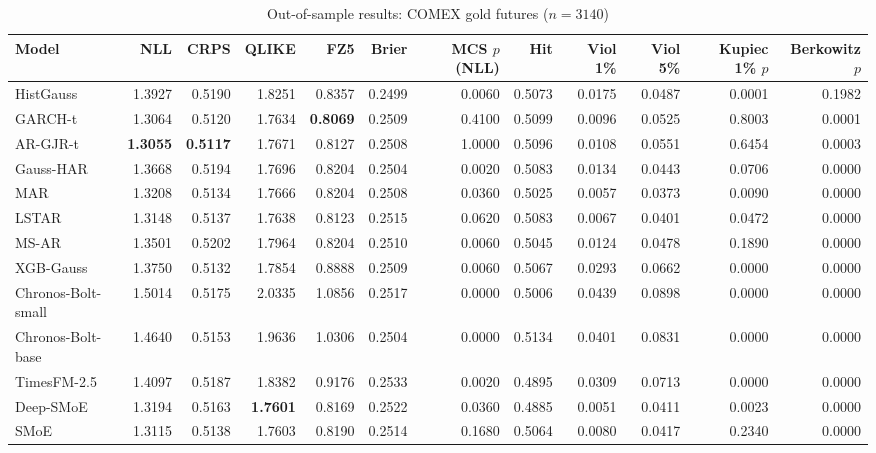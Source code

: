 \begin{table}[!htbp]\centering\scriptsize
\caption{Out-of-sample results: COMEX gold futures ($n=3140$)}\label{tab:asset_gc_fut}
\begin{adjustbox}{max width=\textwidth}
\begin{tabular}{lrrrrrrrrrrr}
\toprule
Model & NLL & CRPS & QLIKE & FZ5 & Brier & MCS $p$ (NLL) & Hit & Viol 1\% & Viol 5\% & Kupiec 1\% $p$ & Berkowitz $p$\\
\midrule
HistGauss & 1.3927 & 0.5190 & 1.8251 & 0.8357 & 0.2499 & 0.0060 & 0.5073 & 0.0175 & 0.0487 & 0.0001 & 0.1982\\
GARCH-t & 1.3064 & 0.5120 & 1.7634 & \textbf{0.8069} & 0.2509 & 0.4100 & 0.5099 & 0.0096 & 0.0525 & 0.8003 & 0.0001\\
AR-GJR-t & \textbf{1.3055} & \textbf{0.5117} & 1.7671 & 0.8127 & 0.2508 & 1.0000 & 0.5096 & 0.0108 & 0.0551 & 0.6454 & 0.0003\\
Gauss-HAR & 1.3668 & 0.5194 & 1.7696 & 0.8204 & 0.2504 & 0.0020 & 0.5083 & 0.0134 & 0.0443 & 0.0706 & 0.0000\\
MAR & 1.3208 & 0.5134 & 1.7666 & 0.8204 & 0.2508 & 0.0360 & 0.5025 & 0.0057 & 0.0373 & 0.0090 & 0.0000\\
LSTAR & 1.3148 & 0.5137 & 1.7638 & 0.8123 & 0.2515 & 0.0620 & 0.5083 & 0.0067 & 0.0401 & 0.0472 & 0.0000\\
MS-AR & 1.3501 & 0.5202 & 1.7964 & 0.8204 & 0.2510 & 0.0060 & 0.5045 & 0.0124 & 0.0478 & 0.1890 & 0.0000\\
XGB-Gauss & 1.3750 & 0.5132 & 1.7854 & 0.8888 & 0.2509 & 0.0060 & 0.5067 & 0.0293 & 0.0662 & 0.0000 & 0.0000\\
Chronos-Bolt-small & 1.5014 & 0.5175 & 2.0335 & 1.0856 & 0.2517 & 0.0000 & 0.5006 & 0.0439 & 0.0898 & 0.0000 & 0.0000\\
Chronos-Bolt-base & 1.4640 & 0.5153 & 1.9636 & 1.0306 & 0.2504 & 0.0000 & 0.5134 & 0.0401 & 0.0831 & 0.0000 & 0.0000\\
TimesFM-2.5 & 1.4097 & 0.5187 & 1.8382 & 0.9176 & 0.2533 & 0.0020 & 0.4895 & 0.0309 & 0.0713 & 0.0000 & 0.0000\\
Deep-SMoE & 1.3194 & 0.5163 & \textbf{1.7601} & 0.8169 & 0.2522 & 0.0360 & 0.4885 & 0.0051 & 0.0411 & 0.0023 & 0.0000\\
SMoE & 1.3115 & 0.5138 & 1.7603 & 0.8190 & 0.2514 & 0.1680 & 0.5064 & 0.0080 & 0.0417 & 0.2340 & 0.0000\\
\bottomrule
\end{tabular}
\end{adjustbox}
\end{table}